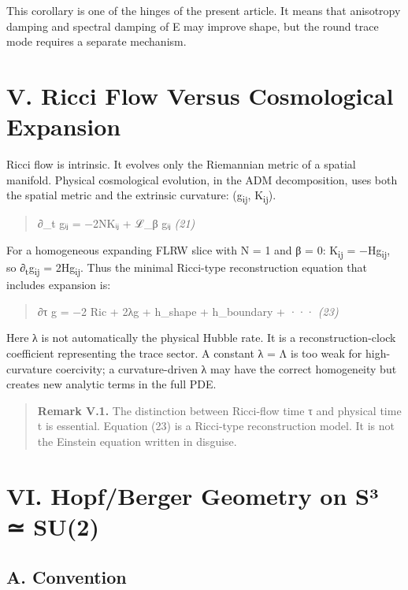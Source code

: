 \documentclass[
]{article}
\begin{document}
This corollary is one of the hinges of the present article. It means that anisotropy damping and spectral damping of E may improve shape, but the round trace mode requires a separate mechanism.

\section{V. Ricci Flow Versus Cosmological Expansion}\label{v.-ricci-flow-versus-cosmological-expansion}

Ricci flow is intrinsic. It evolves only the Riemannian metric of a spatial manifold. Physical cosmological evolution, in the ADM decomposition, uses both the spatial metric and the extrinsic curvature: (g\textsubscript{ij}, K\textsubscript{ij}).

\begin{quote}
∂\_t gᵢⱼ = −2NKᵢⱼ + ℒ\_β gᵢⱼ \emph{(21)}
\end{quote}

For a homogeneous expanding FLRW slice with N = 1 and β = 0: K\textsubscript{ij} = −Hg\textsubscript{ij}, so ∂\textsubscript{t}g\textsubscript{ij} = 2Hg\textsubscript{ij}. Thus the minimal Ricci-type reconstruction equation that includes expansion is:

\begin{quote}
∂τ g = −2 Ric + 2λg + h\_shape + h\_boundary + ··· \emph{(23)}
\end{quote}

Here λ is not automatically the physical Hubble rate. It is a reconstruction-clock coefficient representing the trace sector. A constant λ = Λ is too weak for high-curvature coercivity; a curvature-driven λ may have the correct homogeneity but creates new analytic terms in the full PDE.

\begin{quote}
\textbf{Remark V.1.} The distinction between Ricci-flow time τ and physical time t is essential. Equation (23) is a Ricci-type reconstruction model. It is not the Einstein equation written in disguise.
\end{quote}

\section{VI. Hopf/Berger Geometry on S³ ≃ SU(2)}\label{vi.-hopfberger-geometry-on-suxb3-su2}

\subsection{A. Convention}\label{a.-convention}
\end{document}
